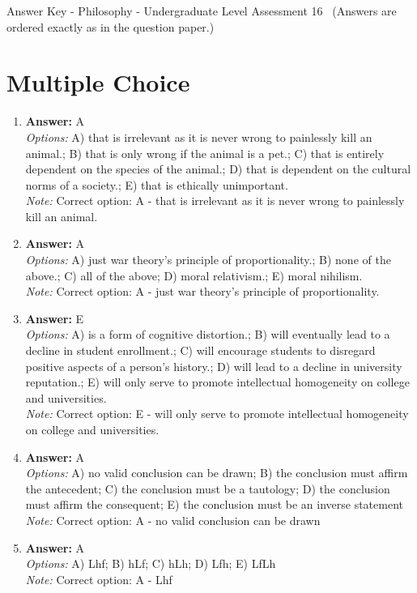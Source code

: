\documentclass[12pt]{article}
\begin{document}
\begin{center}
Answer Key - Philosophy - Undergraduate Level Assessment 16 \
\small (Answers are ordered exactly as in the question paper.)
\end{center}

\section*{Multiple Choice}
\begin{enumerate}[label=\arabic*.]
\item \textbf{Answer:} A
\\ \textit{Options:} A) that is irrelevant as it is never wrong to painlessly kill an animal.; B) that is only wrong if the animal is a pet.; C) that is entirely dependent on the species of the animal.; D) that is dependent on the cultural norms of a society.; E) that is ethically unimportant.
\\ \textit{Note:} Correct option: A - that is irrelevant as it is never wrong to painlessly kill an animal.
\item \textbf{Answer:} A
\\ \textit{Options:} A) just war theory's principle of proportionality.; B) none of the above.; C) all of the above; D) moral relativism.; E) moral nihilism.
\\ \textit{Note:} Correct option: A - just war theory's principle of proportionality.
\item \textbf{Answer:} E
\\ \textit{Options:} A) is a form of cognitive distortion.; B) will eventually lead to a decline in student enrollment.; C) will encourage students to disregard positive aspects of a person's history.; D) will lead to a decline in university reputation.; E) will only serve to promote intellectual homogeneity on college and universities.
\\ \textit{Note:} Correct option: E - will only serve to promote intellectual homogeneity on college and universities.
\item \textbf{Answer:} A
\\ \textit{Options:} A) no valid conclusion can be drawn; B) the conclusion must affirm the antecedent; C) the conclusion must be a tautology; D) the conclusion must affirm the consequent; E) the conclusion must be an inverse statement
\\ \textit{Note:} Correct option: A - no valid conclusion can be drawn
\item \textbf{Answer:} A
\\ \textit{Options:} A) Lhf; B) hLf; C) hLh; D) Lfh; E) LfLh
\\ \textit{Note:} Correct option: A - Lhf
\end{enumerate}
\end{document}
